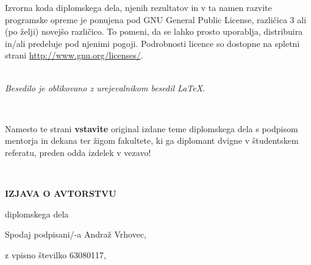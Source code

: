 \documentclass[12pt,a4paper,openany]{book}
\begin{document}
\vspace*{1.5cm}
{\small \noindent
Izvorna koda diplomskega dela, njenih rezultatov in v ta namen razvite programske opreme je ponujena pod GNU General Public License,
različica 3 ali (po želji) novejšo različico. To pomeni, da se lahko prosto uporablja, distribuira in/ali predeluje pod njenimi pogoji.
Podrobnosti licence so dostopne na spletni strani \url{http://www.gnu.org/licenses/}.
}

\begin{center}
\ \\ \vfill
{\em
Besedilo je oblikovano z urejevalnikom besedil \LaTeX.
}
\end{center}

\newpage

\ \thispagestyle{empty}

\newpage


\thispagestyle{empty}

Namesto te strani {\bf vstavite} original izdane teme diplomskega dela s podpisom mentorja in dekana ter \v zigom fakultete, ki ga diplomant
dvigne v študent\-skem referatu,  preden odda izdelek v vezavo!

\newpage


\ \thispagestyle{empty}

\newpage



\thispagestyle{empty}

\vspace{1cm}
\begin{center}
{\Large \textbf{IZJAVA O AVTORSTVU}}
\end{center}

\begin{center}
{\Large diplomskega dela}
\end{center}

\vspace{1cm}
Spodaj podpisani/-a \hspace{0.5cm} Andraž Vrhovec,

\vspace{0.5cm}
z vpisno številko \hspace{0.5cm} 63080117,
\end{document}
